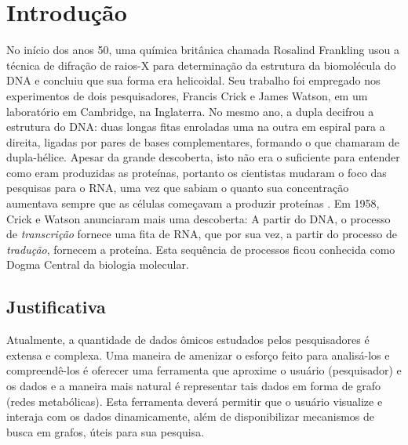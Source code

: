 \chapter{Introdução}


\indent No início dos anos 50, uma química britânica chamada Rosalind Frankling usou a técnica de difração de raios-X para determinação da estrutura da biomolécula do DNA e concluiu que sua forma era helicoidal. Seu trabalho foi empregado nos experimentos de dois pesquisadores, Francis Crick e James Watson, em um laboratório em Cambridge, na Inglaterra. No mesmo ano, a dupla decifrou a estrutura do DNA: duas longas fitas enroladas uma na outra em espiral para a direita, ligadas por pares de bases complementares, formando o que chamaram de dupla-hélice. Apesar da grande descoberta, isto não era o suficiente para entender como eram produzidas as proteínas, portanto os cientistas mudaram o foco das pesquisas para o RNA, uma vez que sabiam o quanto sua concentração aumentava sempre que as células começavam a produzir proteínas \cite{violinist12}. Em 1958, Crick e Watson anunciaram mais uma descoberta: A partir do DNA, o processo de \textit{transcrição} fornece uma fita de RNA, que por sua vez, a partir do processo de \textit{tradução}, fornecem a proteína. Esta sequência de processos ficou conhecida como Dogma Central da biologia molecular. \\ 





\section{Justificativa}
\indent Atualmente, a quantidade de dados ômicos estudados pelos pesquisadores é extensa e complexa. Uma maneira de amenizar o esforço feito para analisá-los e compreendê-los é oferecer uma ferramenta que aproxime o usuário (pesquisador) e os dados e a maneira mais natural é representar tais dados em forma de grafo (redes metabólicas). Esta ferramenta deverá permitir que o usuário visualize e interaja com os dados dinamicamente, além de disponibilizar mecanismos de busca em grafos, úteis para sua pesquisa.

